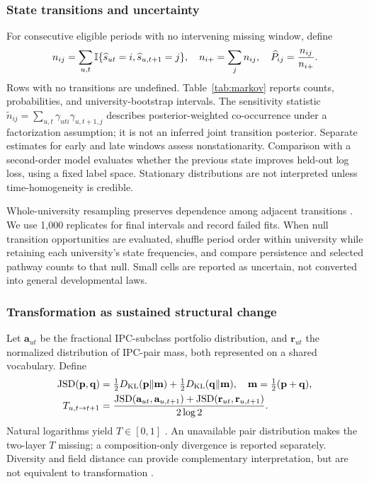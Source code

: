 \subsubsection{State transitions and uncertainty}
For consecutive eligible periods with no intervening missing window, define
\begin{equation}
 n_{ij}=\sum_{u,t}\mathbb{I}\{\widehat s_{ut}=i,\widehat s_{u,t+1}=j\},
 \quad n_{i+}=\sum_jn_{ij},\quad
 \widehat P_{ij}=\frac{n_{ij}}{n_{i+}}.
 \label{eq:markov}
\end{equation}
Rows with no transitions are undefined. Table~\ref{tab:markov} reports counts,
probabilities, and university-bootstrap intervals. The sensitivity statistic
$\widetilde n_{ij}=\sum_{u,t}\gamma_{uti}\gamma_{u,t+1,j}$ describes posterior-weighted
co-occurrence under a factorization assumption; it is not an inferred joint
transition posterior. Separate estimates for early and late windows assess
nonstationarity. Comparison with a second-order model evaluates whether the
previous state improves held-out log loss, using a fixed label space.
Stationary distributions are not interpreted unless time-homogeneity is credible.

Whole-university resampling preserves dependence among adjacent transitions
\citep{efron1979}. We use 1,000 replicates for final intervals and record failed
fits. When null transition opportunities are evaluated, shuffle period order
within university while retaining each university's state frequencies, and
compare persistence and selected pathway counts to that null. Small cells are
reported as uncertain, not converted into general developmental laws.

\subsubsection{Transformation as sustained structural change}
Let $\mathbf{a}_{ut}$ be the fractional IPC-subclass portfolio distribution, and
$\mathbf{r}_{ut}$ the normalized distribution of IPC-pair mass, both represented
on a shared vocabulary. Define
\begin{align}
 \operatorname{JSD}(\mathbf{p},\mathbf{q})&=\tfrac12D_{\mathrm{KL}}(\mathbf{p}\|\mathbf{m})+
                   \tfrac12D_{\mathrm{KL}}(\mathbf{q}\|\mathbf{m}),\quad
                   \mathbf{m}=\tfrac12(\mathbf{p}+\mathbf{q}),\\
 T_{u,t\rightarrow t+1}&=\frac{\operatorname{JSD}(\mathbf{a}_{ut},\mathbf{a}_{u,t+1})+
                    \operatorname{JSD}(\mathbf{r}_{ut},\mathbf{r}_{u,t+1})}{2\log2}.
 \label{eq:transformation}
\end{align}
Natural logarithms yield $T\in[0,1]$ \citep{lin1991}. An unavailable pair
distribution makes the two-layer $T$ missing; a composition-only divergence is
reported separately. Diversity and field distance can provide complementary
interpretation, but are not equivalent to transformation
\citep{stirling2007,porter2009}.

